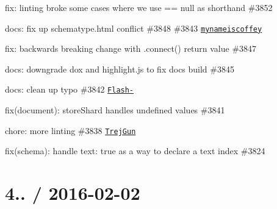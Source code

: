 \begin{DoxyItemize}
\item fix\+: linting broke some cases where we use {\ttfamily == null} as shorthand \#3852
\item docs\+: fix up schematype.\+html conflict \#3848 \#3843 \href{https://github.com/mynameiscoffey}{\tt mynameiscoffey}
\item fix\+: backwards breaking change with {\ttfamily .connect()} return value \#3847
\item docs\+: downgrade dox and highlight.\+js to fix docs build \#3845
\item docs\+: clean up typo \#3842 \href{https://github.com/Flash-}{\tt Flash-\/}
\item fix(document)\+: store\+Shard handles undefined values \#3841
\item chore\+: more linting \#3838 \href{https://github.com/TrejGun}{\tt Trej\+Gun}
\item fix(schema)\+: handle {\ttfamily text\+: true} as a way to declare a text index \#3824
\end{DoxyItemize}

\section*{4.. / 2016-\/02-\/02 }


